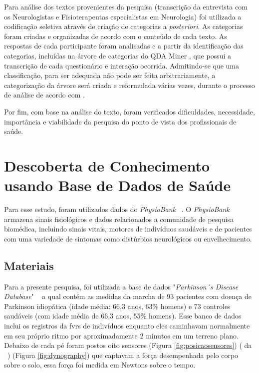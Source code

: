 Para análise dos textos provenientes da pesquisa (transcrição da entrevista com os Neurologistas e Fisioterapeutas especialistas em Neurologia) foi utilizada a codificação seletiva através de criação de categorias a \emph{posteriori}. As categorias foram criadas e organizadas de acordo com o conteúdo de cada texto. As respostas de cada participante foram analisadas e a partir da identificação das categorias, incluídas na árvore de categorias do QDA Miner \cite{qda13}, que possui a transcrição de cada questionário e interação ocorrida. Admitindo-se que uma classificação, para ser adequada não pode ser feita arbitrariamente, a categorização da árvore será criada e reformulada várias vezes, durante o processo de análise de acordo com \cite{FLI04}.

Por fim, com base na análise do texto, foram verificados dificuldades, necessidade, importância e viabilidade da pesquisa do ponto de vista dos profissionais de saúde.
 
\section{Descoberta de Conhecimento usando Base de Dados de Saúde}
Para esse estudo, foram utilizados dados do \textit{PhysioBank} ~\cite{physionet}. O \textit{PhysioBank} armazena sinais fisiológicos e dados relacionados a comunidade de pesquisa biomédica, incluindo sinais vitais, motores de indivíduos saudáveis e de pacientes com uma variedade de sintomas como distúrbios neurológicos ou envelhecimento. 

\subsection{Materiais}
Para a presente pesquisa, foi utilizada a base de dados "\textit{Parkinson´s Disease Database}" ~\cite{physionet} a qual contém as medidas da marcha de 93 pacientes com doença de Parkinson idiopática (idade média: 66,3 anos, 63$\%$ homens) e 73 controles saudáveis ​​(com idade média de 66,3 anos, 55$\%$ homens). Esse banco de dados inclui os registros da \ac{fvrs} de indivíduos enquanto eles caminhavam normalmente em seu próprio ritmo por aproximadamente 2 minutos em um terreno plano. Debaixo de cada pé foram postos oito sensores (Figura \ref{fig:posicaosensores}) ( da  ~\cite{dyno}) (Figura \ref{fig:dynography}) que captavam a força desempenhada pelo corpo sobre o solo, essa força foi medida em Newtons sobre o tempo. 

